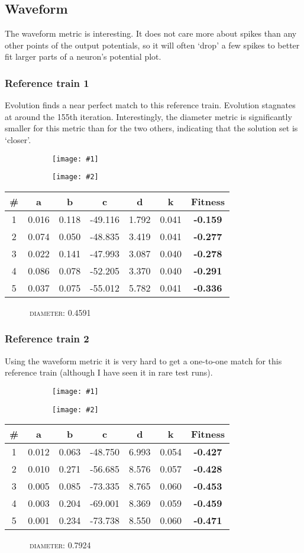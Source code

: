 \documentclass[a4paper,9pt]{article}
\newcommand{\tightit}{\vspace{-5pt}}
\newcommand{\casedata}[4]{
    \begin{figure}[!h]
        \centering
        \begin{subfigure}{.5\textwidth}
          \centering
          \texttt{[image: \#1]}
        \end{subfigure}%
        \begin{subfigure}{.5\textwidth}
          \centering
          \texttt{[image: \#2]}
        \end{subfigure}
    \end{figure}

    { \scriptsize
    \begin{tabular}{c|c|c|c|c|c||c}
    \textbf{\#} & \textbf{a} & \textbf{b} & \textbf{c} & 
      \textbf{d} & \textbf{k} & \textbf{Fitness} \\ \hline
      #3
    \end{tabular} 
    \textsc{~~~~~~diameter:} #4
    \ \\
    }
}
\begin{document}
\subsection{Waveform}
\tightit
The waveform metric is interesting. It does not care more about spikes than
any other points of the output potentials, so it will often `drop' a few
spikes to better fit larger parts of a neuron's potential plot. 

\subsubsection{Reference train 1}
\tightit
Evolution finds a near perfect match to this reference train. Evolution
stagnates at around the 155th iteration. Interestingly, the diameter metric is
significantly smaller for this metric than for the two others, indicating that
the solution set is `closer'.

\casedata{../data/izzy-train1.dat_waveform_3.png}
         {../data/izzy-train1.dat_waveform_3.dev.png}
         {
1 & 0.016 & 0.118 & -49.116 & 1.792 & 0.041 &\textbf{-0.159} \\ \hline
2 & 0.074 & 0.050 & -48.835 & 3.419 & 0.041 &\textbf{-0.277} \\ \hline
3 & 0.022 & 0.141 & -47.993 & 3.087 & 0.040 &\textbf{-0.278} \\ \hline
4 & 0.086 & 0.078 & -52.205 & 3.370 & 0.040 &\textbf{-0.291} \\ \hline
5 & 0.037 & 0.075 & -55.012 & 5.782 & 0.041 &\textbf{-0.336} \\ \hline
         }
         {0.4591}


\subsubsection{Reference train 2}
\tightit
Using the waveform metric it is very hard to get a one-to-one match for this
reference train (although I have seen it in rare test runs). 

\casedata{../data/izzy-train2.dat_waveform_4.png}
         {../data/izzy-train2.dat_waveform_4.dev.png}
         {
1 & 0.012 & 0.063 & -48.750 & 6.993 & 0.054 &\textbf{-0.427} \\ \hline
2 & 0.010 & 0.271 & -56.685 & 8.576 & 0.057 &\textbf{-0.428} \\ \hline
3 & 0.005 & 0.085 & -73.335 & 8.765 & 0.060 &\textbf{-0.453} \\ \hline
4 & 0.003 & 0.204 & -69.001 & 8.369 & 0.059 &\textbf{-0.459} \\ \hline
5 & 0.001 & 0.234 & -73.738 & 8.550 & 0.060 &\textbf{-0.471} \\ \hline
         }
         {0.7924}
\end{document}
